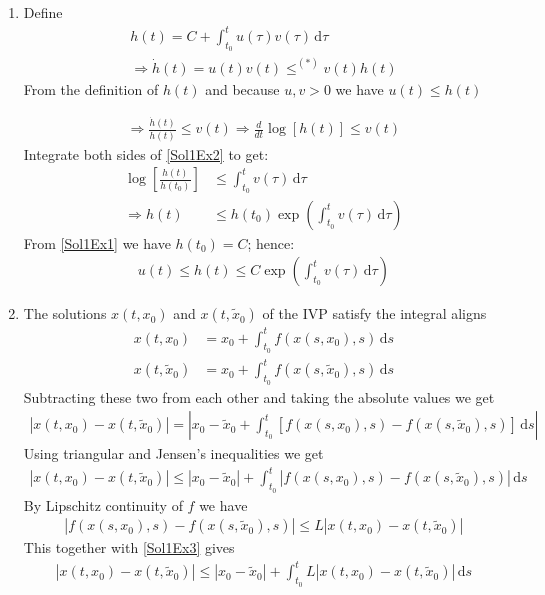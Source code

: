 \begin{solution}[2.1] 
	\leavevmode
\begin{enumerate}
\item Define
\begin{align}\label{Sol1Ex1}
	h(t) = C + \int_{t_0}^t u(\tau)v(\tau)\,\text{d}\tau \\
	\Longrightarrow \dot{h}(t) = u(t)v(t) \leq^{(\ast)} v(t)h(t) 
\end{align}
From the definition of $h(t)$ and because $u,v>0$ we have $u(t) \leq h(t)$

\begin{align}\label{Sol1Ex2}
\Longrightarrow \frac{\dot{h}(t)}{h(t)} \leq v(t) \Longrightarrow \frac{d}{dt} \log \left[ h(t) \right] \leq v(t)
\end{align}
Integrate both sides of \eqref{Sol1Ex2} to get:
\begin{align}
	\log \left[ \frac{h(t)}{h(t_0)} \right] &\leq \int_{t_0}^t v(\tau)\,\text{d}\tau \\
	\Longrightarrow h(t) &\leq h(t_0) \exp\left( \int_{t_0}^t v(\tau)\,\text{d}\tau \right)
\end{align}
From \eqref{Sol1Ex1} we have $h(t_0)=C$; hence:
\begin{align}
	u(t) \leq h(t) \leq C \exp\left( \int_{t_0}^t v(\tau)\,\text{d}\tau \right)
\end{align}


\item The solutions $x(t,x_0)$ and $x(t,\tilde{x}_0)$ of the IVP satisfy the integral aligns
\begin{align}
	x(t,x_0) &= x_0 + \int_{t_0}^t f(x(s,x_0),s)\,\text{d}s \\
	x(t,\tilde{x}_0) &= x_0 + \int_{t_0}^t f(x(s,\tilde{x}_0),s)\,\text{d}s
\end{align}
Subtracting these two from each other and taking the absolute values we get
\begin{align}
	\left\vert x(t,x_0) - x(t,\tilde{x}_0) \right\vert = \left\vert x_0 - \tilde{x}_0 + \int_{t_0}^t \left[ f(x(s,x_0),s) - f(x(s,\tilde{x}_0),s) \right]\,\text{d}s \right\vert
\end{align}
Using triangular and Jensen's inequalities we get
\begin{align}\label{Sol1Ex3}
	\left\vert x(t,x_0) - x(t,\tilde{x}_0) \right\vert \leq \left\vert x_0 - \tilde{x}_0 \right\vert + \int_{t_0}^t \left\vert f(x(s,x_0),s) - f(x(s,\tilde{x}_0),s) \right\vert\,\text{d}s
\end{align}
By Lipschitz continuity of $f$ we have
\begin{align}
	\left\vert f(x(s,x_0),s) - f(x(s,\tilde{x}_0),s) \right\vert \leq L \left\vert x(t,x_0) - x(t,\tilde{x}_0) \right\vert
\end{align}
This together with \eqref{Sol1Ex3} gives
\begin{align}
	\left\vert x(t,x_0) - x(t,\tilde{x}_0) \right\vert \leq \left\vert x_0 - \tilde{x}_0 \right\vert + \int_{t_0}^t L \left\vert x(t,x_0) - x(t,\tilde{x}_0) \right\vert\,\text{d}s
\end{align}


\end{enumerate}
\end{solution}
